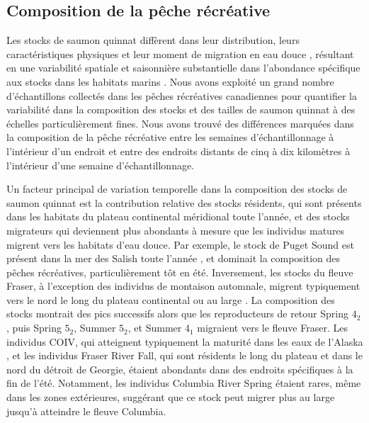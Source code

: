 \subsection{Composition de la pêche récréative}

Les stocks de saumon quinnat diffèrent dans leur distribution, leurs caractéristiques physiques et leur moment de migration en eau douce \citep{healeyLifeHistoryChinook1991, weitkampMarineDistributionsChinook2010}, résultant en une variabilité spatiale et saisonnière substantielle dans l'abondance spécifique aux stocks dans les habitats marins \citep{sheltonUsingHierarchicalModels2019, freshwaterIntegratedModelSeasonal2021}. Nous avons exploité un grand nombre d'échantillons collectés dans les pêches récréatives canadiennes pour quantifier la variabilité dans la composition des stocks et des tailles de saumon quinnat à des échelles particulièrement fines. Nous avons trouvé des différences marquées dans la composition de la pêche récréative entre les semaines d'échantillonnage à l'intérieur d'un endroit et entre des endroits distants de cinq à dix kilomètres à l'intérieur d'une semaine d'échantillonnage.

Un facteur principal de variation temporelle dans la composition des stocks de saumon quinnat est la contribution relative des stocks résidents, qui sont présents dans les habitats du plateau continental méridional toute l'année, et des stocks migrateurs qui deviennent plus abondants à mesure que les individus matures migrent vers les habitats d'eau douce. Par exemple, le stock de Puget Sound est présent dans la mer des Salish toute l'année \citep{oneillMarineDistributionLife2009, freshwaterIntegratedModelSeasonal2021}, et dominait la composition des pêches récréatives, particulièrement tôt en été. Inversement, les stocks du fleuve Fraser, à l'exception des individus de montaison automnale, migrent typiquement vers le nord le long du plateau continental ou au large \citep{ctc2021AnnualReport2022}. La composition des stocks montrait des pics successifs alors que les reproducteurs de retour Spring $4_2$, puis Spring $5_2$, Summer $5_2$, et Summer $4_1$ migraient vers le fleuve Fraser. Les individus COIV, qui atteignent typiquement la maturité dans les eaux de l'Alaska \citep{sheltonUsingHierarchicalModels2019}, et les individus Fraser River Fall, qui sont résidents le long du plateau et dans le nord du détroit de Georgie, étaient abondants dans des endroits spécifiques à la fin de l'été. Notamment, les individus Columbia River Spring étaient rares, même dans les zones extérieures, suggérant que ce stock peut migrer plus au large jusqu'à atteindre le fleuve Columbia.

